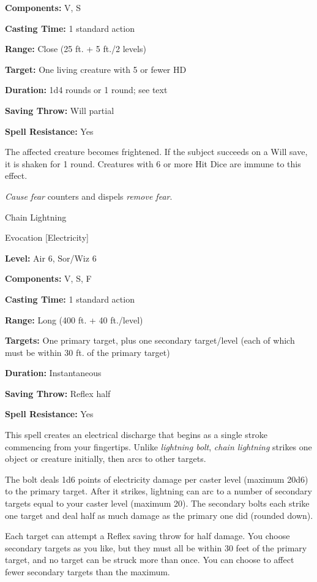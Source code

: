 \documentclass{article}
\begin{document}
\textbf{Components:} V, S

\textbf{Casting Time:} 1 standard action

\textbf{Range:} Close (25 ft. + 5 ft./2 levels)

\textbf{Target:} One living creature with 5 or fewer HD

\textbf{Duration:} 1d4 rounds or 1 round; see text

\textbf{Saving Throw: }Will partial

\textbf{Spell Resistance:} Yes

The affected creature becomes frightened. If the subject succeeds on a Will save, 
it is shaken for 1 round. Creatures with 6 or more Hit Dice are immune to this 
effect.

\textit{Cause fear }counters and dispels \textit{remove fear}.

\vspace{12pt}
Chain Lightning

Evocation [Electricity]

\textbf{Level:} Air 6, Sor/Wiz 6

\textbf{Components:} V, S, F

\textbf{Casting Time:} 1 standard action

\textbf{Range:} Long (400 ft. + 40 ft./level)

\textbf{Targets:} One primary target, plus one secondary target/level (each of 
which must be within 30 ft. of the primary target)

\textbf{Duration:} Instantaneous

\textbf{Saving Throw:} Reflex half

\textbf{Spell Resistance:} Yes

This spell creates an electrical discharge that begins as a single stroke commencing 
from your fingertips. Unlike \textit{lightning bolt}, \textit{chain lightning }strikes 
one object or creature initially, then arcs to other targets.

The bolt deals 1d6 points of electricity damage per caster level (maximum 20d6) 
to the primary target. After it strikes, lightning can arc to a number of secondary 
targets equal to your caster level (maximum 20). The secondary bolts each strike 
one target and deal half as much damage as the primary one did (rounded down).

Each target can attempt a Reflex saving throw for half damage. You choose secondary 
targets as you like, but they must all be within 30 feet of the primary target, 
and no target can be struck more than once. You can choose to affect fewer secondary 
targets than the maximum.
\end{document}
